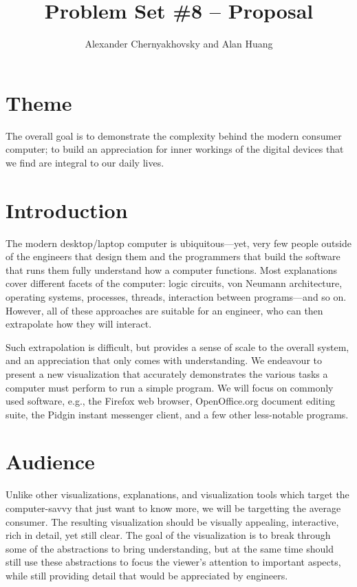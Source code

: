 \documentclass[12pt]{article}
\newcommand{\student}{Alexander Chernyakhovsky and Alan Huang}
\newcommand{\pset}{Problem Set \#8 -- Proposal}
\begin{document}
\title{\pset}
\author{\student}
\date{}
\maketitle
\thispagestyle{fancy}

\section{Theme}
The overall goal is to demonstrate the complexity behind the modern
consumer computer; to build an appreciation for inner workings of the
digital devices that we find are integral to our daily lives.

\section{Introduction}
The modern desktop/laptop computer is ubiquitous---yet, very few
people outside of the engineers that design them and the programmers
that build the software that runs them fully understand how a computer
functions.  Most explanations cover different facets of the computer:
logic circuits, von Neumann architecture, operating systems,
processes, threads, interaction between programs---and so on.
However, all of these approaches are suitable for an engineer, who
can then extrapolate how they will interact.

Such extrapolation is difficult, but provides a sense of scale to the
overall system, and an appreciation that only comes with
understanding.  We endeavour to present a new visualization that
accurately demonstrates the various tasks a computer must perform to
run a simple program.  We will focus on commonly used software, e.g.,
the Firefox web browser, OpenOffice.org document editing suite, the
Pidgin instant messenger client, and a few other less-notable programs.

\section{Audience}
Unlike other visualizations, explanations, and visualization tools
which target the computer-savvy that just want to know more, we will
be targetting the average consumer.  The resulting visualization
should be visually appealing, interactive, rich in detail, yet still
clear.  The goal of the visualization is to break through some of the
abstractions to bring understanding, but at the same time should still
use these abstractions to focus the viewer's attention to important
aspects, while still providing detail that would be appreciated by
engineers.
\end{document}

